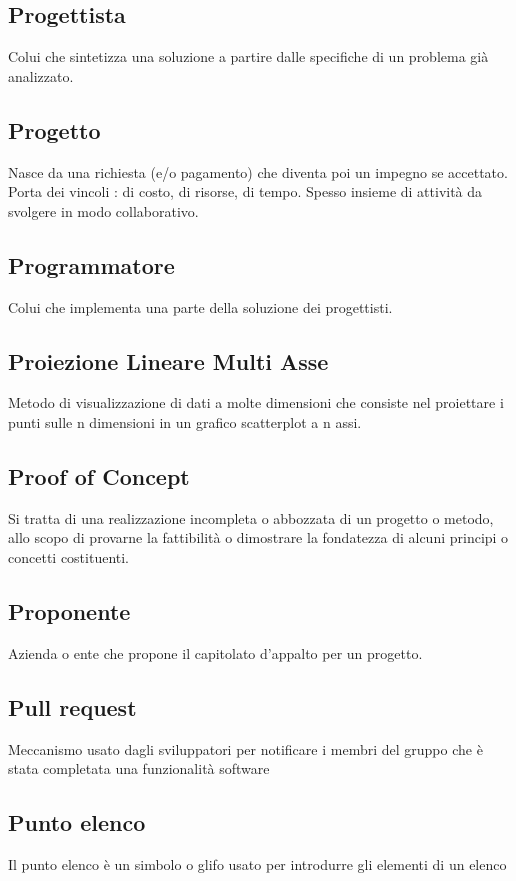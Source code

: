 \documentclass[../glossario.tex]{subfiles}
\begin{document}
\subsection*{Progettista}
{}
Colui che sintetizza una soluzione a partire dalle specifiche di un problema già analizzato.

\subsection*{Progetto}
{}
Nasce da una richiesta (e/o pagamento) che diventa poi un impegno se accettato. Porta dei vincoli : di costo, di risorse, di tempo. Spesso insieme di attività da svolgere in modo collaborativo.

\subsection*{Programmatore}
{}
Colui che implementa una parte della soluzione dei progettisti.

\subsection*{Proiezione Lineare Multi Asse}
{}
Metodo di visualizzazione di dati a molte dimensioni che consiste nel proiettare i punti sulle n dimensioni in un grafico scatterplot a n assi.

\subsection*{Proof of Concept}
{}
Si tratta di una realizzazione incompleta o abbozzata di un progetto o metodo, allo scopo di provarne la fattibilità o dimostrare la fondatezza di alcuni principi o concetti costituenti.

\subsection*{Proponente}
{}
Azienda o ente che propone il capitolato d'appalto per un progetto.

\subsection*{Pull request}
{}
Meccanismo usato dagli sviluppatori per notificare i membri del gruppo che è stata completata una funzionalità software

\subsection*{Punto elenco}
{}
Il punto elenco è un simbolo o glifo usato per introdurre gli elementi di un elenco
\end{document}

